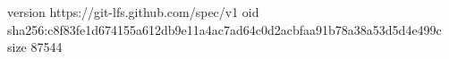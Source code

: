 version https://git-lfs.github.com/spec/v1
oid sha256:c8f83fe1d674155a612db9e11a4ac7ad64c0d2acbfaa91b78a38a53d5d4e499c
size 87544
